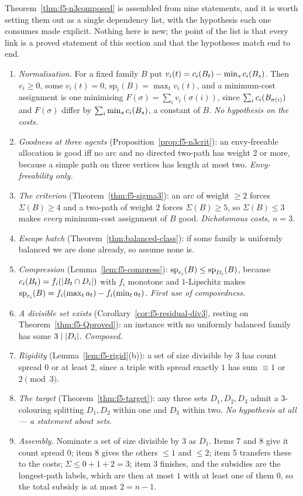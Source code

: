Theorem~\ref{thm:f5-n3composed} is assembled from nine statements, and it is
worth setting them out as a single dependency list, with the hypothesis each one
consumes made explicit. Nothing here is new; the point of the list is that every
link is a proved statement of this section and that the hypotheses match end to
end.

\begin{enumerate}\itemsep2pt
\item \emph{Normalisation.} For a fixed family $B$ put
  $v_i(t) = c_i(B_t) - \min_s c_i(B_s)$. Then $v_i \ge 0$, some
  $v_i(t) = 0$, $\mathrm{sp}_i(B) = \max_t v_i(t)$, and a minimum-cost
  assignment is one minimising $F(\sigma) = \sum_i v_i(\sigma(i))$, since
  $\sum_i c_i(B_{\sigma(i)})$ and $F(\sigma)$ differ by
  $\sum_i \min_s c_i(B_s)$, a constant of $B$. \emph{No hypothesis on the
  costs.}
\item \emph{Goodness at three agents}
  (Proposition~\ref{prop:f5-n3crit}): an envy-freeable allocation is good iff no
  arc and no directed two-path has weight $2$ or more, because a simple path on
  three vertices has length at most two. \emph{Envy-freeability only.}
\item \emph{The criterion} (Theorem~\ref{thm:f5-sigma3}): an arc of weight
  $\ge 2$ forces $\Sigma(B) \ge 4$ and a two-path of weight $2$ forces
  $\Sigma(B) \ge 5$, so $\Sigma(B) \le 3$ makes \emph{every} minimum-cost
  assignment of $B$ good. \emph{Dichotomous costs, $n = 3$.}
\item \emph{Escape hatch} (Theorem~\ref{thm:balanced-class}): if some family is
  uniformly balanced we are done already, so assume none is.
\item \emph{Compression} (Lemma~\ref{lem:f5-compress}):
  $\mathrm{sp}_{c_i}(B) \le \mathrm{sp}_{D_i}(B)$, because
  $c_i(B_t) = f_i(\left\lvert B_t \cap D_i\right\rvert)$ with $f_i$ monotone and $1$-Lipschitz
  makes $\mathrm{sp}_{c_i}(B) = f_i(\max_t a_t) - f_i(\min_t a_t)$.
  \emph{First use of composedness.}
\item \emph{A divisible set exists} (Corollary~\ref{cor:f5-residual-div3}, resting
  on Theorem~\ref{thm:f5-Qproved}): an instance with no uniformly balanced family
  has some $3 \mid \left\lvert D_i\right\rvert$. \emph{Composed.}
\item \emph{Rigidity} (Lemma~\ref{lem:f5-rigid}(b)): a set of size divisible by
  $3$ has count spread $0$ or at least $2$, since a triple with spread exactly
  $1$ has sum $\equiv 1$ or $2 \pmod 3$.
\item \emph{The target} (Theorem~\ref{thm:f5-target}): any three sets
  $D_1,D_2,D_3$ admit a $3$-colouring splitting $D_1,D_2$ within one and $D_3$
  within two. \emph{No hypothesis at all --- a statement about sets.}
\item \emph{Assembly.} Nominate a set of size divisible by $3$ as $D_1$. Items
  7 and 8 give it count spread $0$; item 8 gives the others $\le 1$ and $\le 2$;
  item 5 transfers these to the costs; $\Sigma \le 0+1+2 = 3$; item 3 finishes,
  and the subsidies are the longest-path labels, which are then at most $1$ with
  at least one of them $0$, so the total subsidy is at most $2 = n-1$.
\end{enumerate}

